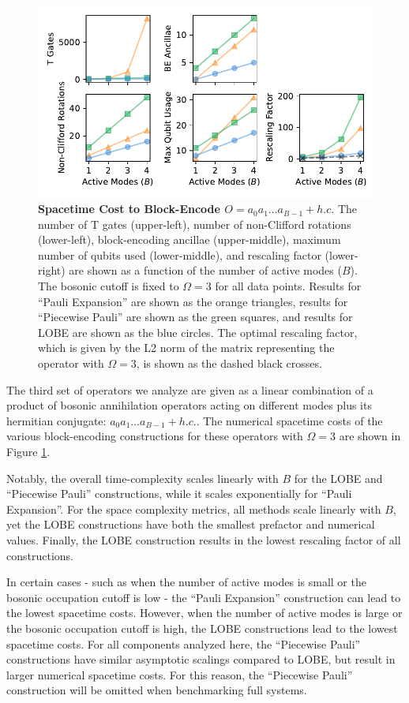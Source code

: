 \begin{figure}
    \centering
    \includegraphics[width=14cm]{figures/bosonic-hc-comparison.pdf}
    \caption{
        \textbf{Spacetime Cost to Block-Encode $O = a_0 a_1 \hdots a_{B-1} + h.c.$}
        The number of T gates (upper-left), number of non-Clifford rotations (lower-left), block-encoding ancillae (upper-middle), maximum number of qubits used (lower-middle), and rescaling factor (lower-right) are shown as a function of the number of active modes ($B$).
        The bosonic cutoff is fixed to $\Omega = 3$ for all data points.
        Results for ``Pauli Expansion'' are shown as the orange triangles, results for ``Piecewise Pauli'' are shown as the green squares, and results for LOBE are shown as the blue circles.
        The optimal rescaling factor, which is given by the L2 norm of the matrix representing the operator with $\Omega = 3$, is shown as the dashed black crosses.
    }
    \label{fig:bosonic-hc-comparison}
\end{figure}

The third set of operators we analyze are given as a linear combination of a product of bosonic annihilation operators acting on different modes plus its hermitian conjugate: $a_0 a_1 \hdots a_{B-1} + h.c.$.
The numerical spacetime costs of the various block-encoding constructions for these operators with $\Omega = 3$ are shown in Figure \ref{fig:bosonic-hc-comparison}.

Notably, the overall time-complexity scales linearly with $B$ for the LOBE and ``Piecewise Pauli'' constructions, while it scales exponentially for ``Pauli Expansion''.
For the space complexity metrics, all methods scale linearly with $B$, yet the LOBE constructions have both the smallest prefactor and numerical values.
Finally, the LOBE construction results in the lowest rescaling factor of all constructions.

In certain cases - such as when the number of active modes is small or the bosonic occupation cutoff is low - the ``Pauli Expansion'' construction can lead to the lowest spacetime costs.
However, when the number of active modes is large or the bosonic occupation cutoff is high, the LOBE constructions lead to the lowest spacetime costs.
For all components analyzed here, the ``Piecewise Pauli'' constructions have similar asymptotic scalings compared to LOBE, but result in larger numerical spacetime costs.
For this reason, the ``Piecewise Pauli'' construction will be omitted when benchmarking full systems.
